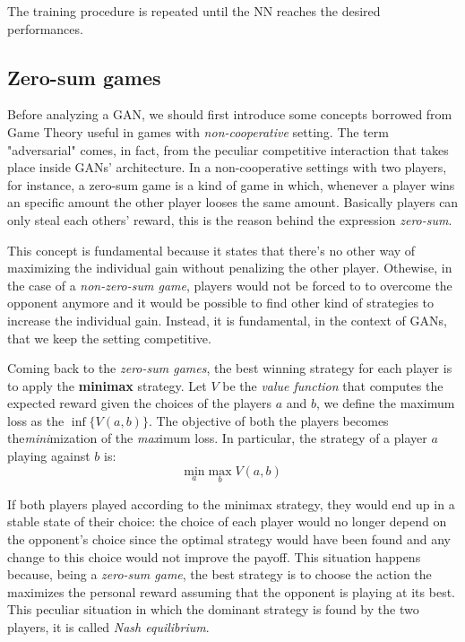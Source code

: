 The training procedure is repeated until the NN reaches the desired performances.


\subsection{Zero-sum games}
Before analyzing a GAN, we should first introduce some concepts borrowed from Game Theory useful in games with \textit{non-cooperative} setting.
The term "adversarial" comes, in fact, from the peculiar competitive interaction that takes place inside GANs' architecture.
In a non-cooperative settings with two players, for instance, a zero-sum game is a kind of game in which, whenever a player wins an specific amount the other player looses the same amount.
Basically players can only steal each others' reward, this is the reason behind the expression \textit{zero-sum}.

This concept is fundamental because it states that there's no other way of maximizing the individual gain without penalizing the other player.
Othewise, in the case of a \textit{non-zero-sum game},  players would not be forced to to overcome the opponent anymore and it would be possible to find other kind of strategies to increase the individual gain.
Instead, it is fundamental, in the context of GANs, that we keep the setting competitive.

Coming back to the \textit{zero-sum games}, the best winning strategy for each player is to apply the \textbf{minimax} strategy.
Let $V$ be the \textit{value function} that computes the expected reward given the choices of the players $a$ and $b$, we define the maximum loss as the $ \inf \{V(a,b)\}$.
The objective of both the players becomes the\textit{mini}mization of the \textit{max}imum loss.
In particular, the strategy of a player $a$ playing against $b$ is:
$$ \underset{a}{\text{min}} \; \underset{b}{\text{max}} \; V(a,b) $$

If both players played according to the minimax strategy, they would end up in a stable state of their choice: the choice of each player would no longer depend on the opponent's choice since the optimal strategy would have been found and any change to this choice would not improve the payoff.
This situation happens because, being a \textit{zero-sum game}, the best strategy is to choose the action the maximizes the personal reward assuming that the opponent is playing at its best.
This peculiar situation in which the dominant strategy is found by the two players, it is called \textit{Nash equilibrium}.

